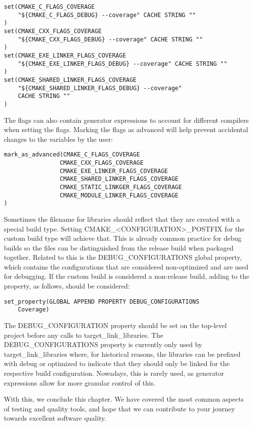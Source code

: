 \begin{lstlisting}[style=styleCMake]
set(CMAKE_C_FLAGS_COVERAGE
	"${CMAKE_C_FLAGS_DEBUG} --coverage" CACHE STRING ""
)
set(CMAKE_CXX_FLAGS_COVERAGE
	"${CMAKE_CXX_FLAGS_DEBUG} --coverage" CACHE STRING ""
)
set(CMAKE_EXE_LINKER_FLAGS_COVERAGE
	"${CMAKE_EXE_LINKER_FLAGS_DEBUG} --coverage" CACHE STRING ""
)
set(CMAKE_SHARED_LINKER_FLAGS_COVERAGE
	"${CMAKE_SHARED_LINKER_FLAGS_DEBUG} --coverage"
	CACHE STRING ""
)
\end{lstlisting}

The flags can also contain generator expressions to account for different compilers when setting the flags. Marking the flags as advanced will help prevent accidental changes to the variables by the user:

\begin{lstlisting}[style=styleCMake]
mark_as_advanced(CMAKE_C_FLAGS_COVERAGE
				CMAKE_CXX_FLAGS_COVERAGE
				CMAKE_EXE_LINKER_FLAGS_COVERAGE
				CMAKE_SHARED_LINKER_FLAGS_COVERAGE
				CMAKE_STATIC_LINKGER_FLAGS_COVERAGE
				CMAKE_MODULE_LINKER_FLAGS_COVERAGE
)
\end{lstlisting}

Sometimes the filename for libraries should reflect that they are created with a special build type. Setting CMAKE\_<CONFIGURATION>\_POSTFIX for the custom build type will achieve that. This is already common practice for debug builds so the files can be distinguished from the release build when packaged together. Related to this is the DEBUG\_CONFIGURATIONS global property, which contains the configurations that are considered non-optimized and are used for debugging. If the custom build is considered a non-release build, adding to the property, as follows, should be considered:

\begin{lstlisting}[style=styleCMake]
set_property(GLOBAL APPEND PROPERTY DEBUG_CONFIGURATIONS
	Coverage)
\end{lstlisting}

The DEBUG\_CONFIGURATION property should be set on the top-level project before any calls to target\_link\_libraries. The DEBUG\_CONFIGURATIONS property is currently only used by target\_link\_libraries where, for historical reasons, the libraries can be prefixed with debug or optimized to indicate that they should only be linked for the respective build configuration. Nowadays, this is rarely used, as generator expressions allow for more granular control of this.

With this, we conclude this chapter. We have covered the most common aspects of testing and quality tools, and hope that we can contribute to your journey towards excellent software quality.













